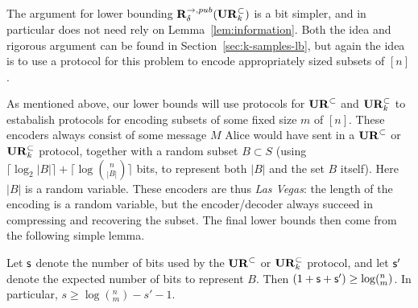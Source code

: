 The argument for lower bounding $\mathbf{R}^{\rightarrow,pub}_\delta(\mathbf{UR}_k^\subset)$ is a bit simpler, and in particular does not need rely on Lemma~\ref{lem:information}. Both the idea and rigorous argument can be found in Section~\ref{sec:k-samples-lb}, but again the idea is to use a protocol for this problem to encode appropriately sized subsets of $[n]$.



As mentioned above, our lower bounds will use protocols for $\mathbf{UR}^\subset$ and $\mathbf{UR}^\subset_k$ to estabalish protocols for encoding subsets of some fixed size $m$ of $[n]$. These encoders always consist of some message $M$ Alice would have sent in a $\mathbf{UR}^\subset$ or $\mathbf{UR}^\subset_k$ protocol, together with a random subset $B\subset S$ (using $\lceil \log_2|B|\rceil + \lceil\log{n\choose |B|}\rceil$ bits, to represent both $|B|$ and the set $B$ itself). Here $|B|$ is a random variable. These encoders are thus {\em Las Vegas}: the length of the encoding is a random variable, but the encoder/decoder always succeed in compressing and recovering the subset. The final lower bounds then come from the following simple lemma. 

\begin{lemma} \label{lemma:lb-meta}
  Let $\textsf{s}$ denote the number of bits used by the $\mathbf{UR}^\subset$ or $\mathbf{UR}^\subset_k$ protocol, and let $\textsf{s}'$ denote the expected number of bits to represent $B$. Then $(1+\textsf{s}+\textsf{s}') \ge \log (^n_m)$. In particular, $s \ge \log(^n_m) - s' - 1$.
\end{lemma}

